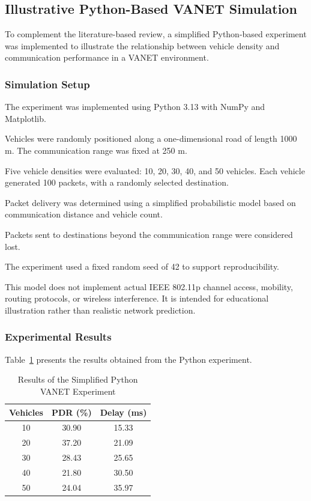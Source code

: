 \subsection{Illustrative Python-Based VANET Simulation}
\label{sec:python_vanet}

To complement the literature-based review,
a simplified Python-based experiment was
implemented to illustrate the relationship
between vehicle density and communication
performance in a VANET environment.

\subsubsection{Simulation Setup}

The experiment was implemented using
Python 3.13 with NumPy and Matplotlib.

Vehicles were randomly positioned along
a one-dimensional road of length 1000 m.
The communication range was fixed at 250 m.

Five vehicle densities were evaluated:
10, 20, 30, 40, and 50 vehicles.
Each vehicle generated 100 packets,
with a randomly selected destination.

Packet delivery was determined using
a simplified probabilistic model based
on communication distance and vehicle count.

Packets sent to destinations beyond
the communication range were considered lost.

The experiment used a fixed random seed
of 42 to support reproducibility.

This model does not implement actual
IEEE 802.11p channel access, mobility,
routing protocols, or wireless interference.
It is intended for educational illustration
rather than realistic network prediction.

\subsubsection{Experimental Results}

Table~\ref{tab:python_results}
presents the results obtained from
the Python experiment.

\begin{table}[htbp]
\centering
\caption{Results of the Simplified Python VANET Experiment}
\label{tab:python_results}
\footnotesize
\begin{tabular}{|c|c|c|}
\hline
\textbf{Vehicles} &
\textbf{PDR (\%)} &
\textbf{Delay (ms)} \\
\hline
10 & 30.90 & 15.33 \\
20 & 37.20 & 21.09 \\
30 & 28.43 & 25.65 \\
40 & 21.80 & 30.50 \\
50 & 24.04 & 35.97 \\
\hline
\end{tabular}
\end{table}

